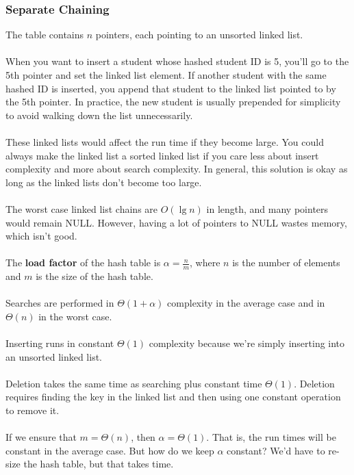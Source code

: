 \documentclass[]{article}
\theoremstyle{definition}
\begin{document}
			\subsubsection{Separate Chaining}
				The table contains $n$ pointers, each pointing to an unsorted linked list.
				\\ \\
				When you want to insert a student whose hashed student ID is 5, you'll go to the 5th pointer and set the linked list element. If another student with the same hashed ID is inserted, you append that student to the linked list pointed to by the 5th pointer. In practice, the new student is usually prepended for simplicity \textendash{} to avoid walking down the list unnecessarily.
				\\ \\
				These linked lists would affect the run time if they become large. You could always make the linked list a sorted linked list if you care less about insert complexity and more about search complexity. In general, this solution is okay as long as the linked lists don't become too large.
				\\ \\
				The worst case linked list chains are $O(\lg n)$ in length, and many pointers would remain NULL. However, having a lot of pointers to NULL wastes memory, which isn't good.
				\\ \\
				The \textbf{load factor} of the hash table is $\alpha = \frac{n}{m}$, where $n$ is the number of elements and $m$ is the size of the hash table.
				\\ \\
				Searches are performed in $\Theta(1 + \alpha)$ complexity in the average case and in $\Theta(n)$ in the worst case.
				\\ \\
				Inserting runs in constant $\Theta(1)$ complexity because we're simply inserting into an unsorted linked list.
				\\ \\
				Deletion takes the same time as searching plus constant time $\Theta(1)$. Deletion requires finding the key in the linked list and then using one constant operation to remove it.
				\\ \\
				If we ensure that $m = \Theta(n)$, then $\alpha = \Theta(1)$. That is, the run times will be constant in the average case. But how do we keep $\alpha$ constant? We'd have to re-size the hash table, but that takes time.
\end{document}
